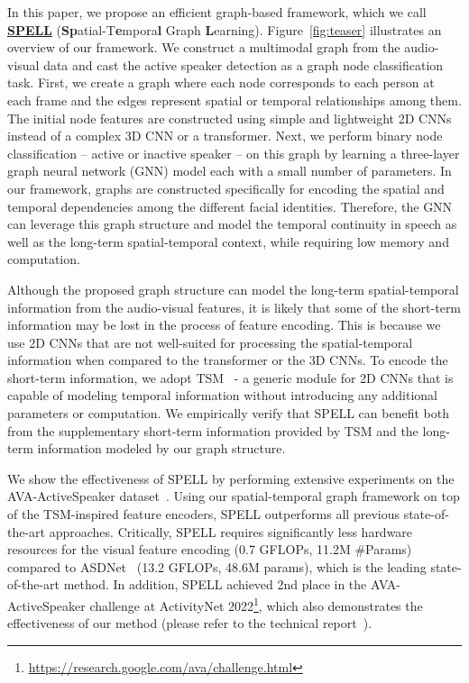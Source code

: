 \documentclass[runningheads]{llncs}
\begin{document}
In this paper, we propose an efficient graph-based framework, which we call \href{https://github.com/kylemin/SPELL}{\color{magenta}\textbf{SPELL}} (\textbf{Sp}atial-T\textbf{e}mpora\textbf{l} Graph \textbf{L}earning). Figure~\ref{fig:teaser} illustrates an overview of our framework. We construct a multimodal graph from the audio-visual data and cast the active speaker detection as a graph node classification task. 
First, we create a graph where each node corresponds to each person at each frame and the edges represent spatial or temporal relationships among them. 
The initial node features are constructed using simple and lightweight 2D CNNs instead of a complex 3D CNN or a transformer. 
Next, we perform binary node classification -- active or inactive speaker -- on this graph by learning a three-layer graph neural network (GNN) model each with a small number of parameters. In our framework, graphs are constructed specifically for encoding the spatial and temporal dependencies among the different facial identities. Therefore, the GNN can leverage this graph structure and model the temporal continuity in speech as well as the long-term spatial-temporal context, while requiring low memory and computation.

Although the proposed graph structure can model the long-term spatial-temporal information from the audio-visual features, it is likely that some of the short-term information may be lost in the process of feature encoding. This is because we use 2D CNNs that are not well-suited for processing the spatial-temporal information when compared to the transformer or the 3D CNNs. To encode the short-term information, we adopt TSM~\cite{lin2019tsm} - a generic module for 2D CNNs that is capable of modeling temporal information without introducing any additional parameters or computation. We empirically verify that SPELL can benefit both from the supplementary short-term information provided by TSM and the long-term information modeled by our graph structure.

We show the effectiveness of SPELL by performing extensive experiments on the AVA-ActiveSpeaker dataset~\cite{roth2020ava}. Using our spatial-temporal graph framework on top of the TSM-inspired feature encoders, SPELL outperforms all previous state-of-the-art approaches. Critically, SPELL requires significantly less hardware resources for the visual feature encoding (0.7 GFLOPs, 11.2M \#Params) compared to ASDNet~\cite{ASDNet_ICCV2021} (13.2 GFLOPs, 48.6M params), which is the leading state-of-the-art method. In addition, SPELL achieved 2nd place in the AVA-ActiveSpeaker challenge at ActivityNet 2022\footnote{\url{https://research.google.com/ava/challenge.html}}, which also demonstrates the effectiveness of our method (please refer to the technical report~\cite{minintel}).
\end{document}

